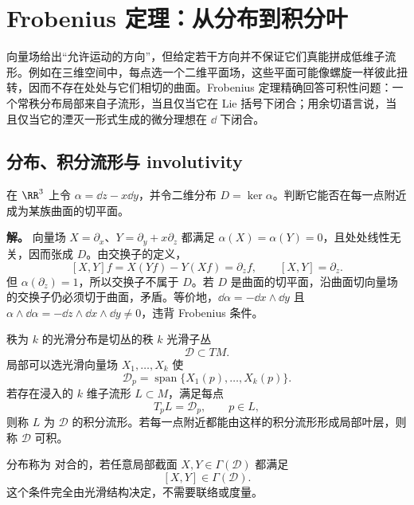 \chapter{Frobenius 定理：从分布到积分叶} \label{chap:math-geometric-structures}

向量场给出“允许运动的方向”，但给定若干方向并不保证它们真能拼成低维子流形。例如在三维空间中，每点选一个二维平面场，这些平面可能像螺旋一样彼此扭转，因而不存在处处与它们相切的曲面。Frobenius 定理精确回答可积性问题：一个常秩分布局部来自子流形，当且仅当它在 Lie 括号下闭合；用余切语言说，当且仅当它的湮灭一形式生成的微分理想在 $\dd$ 下闭合。

\section{分布、积分流形与 involutivity}

\begin{workedexample}[不可积的平面分布]
在 \(\RR^3\) 上令 \(\alpha=\dd z-x\dd y\)，并令二维分布 \(D=\ker\alpha\)。判断它能否在每一点附近成为某族曲面的切平面。

\textbf{解。} 向量场 \(X=\partial_x\)、\(Y=\partial_y+x\partial_z\) 都满足 \(\alpha(X)=\alpha(Y)=0\)，且处处线性无关，因而张成 \(D\)。由交换子的定义，
\[
[X,Y]f=X(Yf)-Y(Xf)=\partial_z f,\qquad [X,Y]=\partial_z.
\]
但 \(\alpha(\partial_z)=1\)，所以交换子不属于 \(D\)。若 \(D\) 是曲面的切平面，沿曲面切向量场的交换子仍必须切于曲面，矛盾。等价地，\(\dd\alpha=-\dd x\wedge\dd y\) 且 \(\alpha\wedge\dd\alpha=-\dd z\wedge\dd x\wedge\dd y\ne0\)，违背 Frobenius 条件。
\end{workedexample}


秩为 $k$ 的光滑分布是切丛的秩 $k$ 光滑子丛
\[
\mathcal D\subset TM.
\]
局部可以选光滑向量场 $X_1,\ldots,X_k$ 使
\[
\mathcal D_p
=\operatorname{span}\{X_1(p),\ldots,X_k(p)\}.
\]
若存在浸入的 $k$ 维子流形 $L\subset M$，满足每点
\[
T_pL=\mathcal D_p,
\qquad p\in L,
\]
则称 $L$ 为 $\mathcal D$ 的积分流形。若每一点附近都能由这样的积分流形形成局部叶层，则称 $\mathcal D$ 可积。

分布称为 对合的，若任意局部截面 $X,Y\in\Gamma(\mathcal D)$ 都满足
\begin{equation}\label{eq:math-dg-frobenius-involutive}
[X,Y]\in\Gamma(\mathcal D).
\end{equation}
这个条件完全由光滑结构决定，不需要联络或度量。

